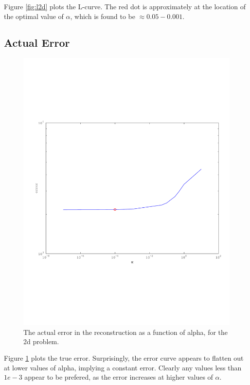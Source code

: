 \documentclass{article}
\begin{document}
Figure \ref{fig:l2d} plots the L-curve. The red dot is approximately at
the location of the optimal value of $\alpha$, which is found to be
$\approx 0.05 - 0.001$. 

\subsection{Actual Error}

\begin{figure}[!htb]
  \includegraphics[scale=.5]{plots/2d-true.pdf}
  \caption{The actual error in the reconstruction as a function of
 alpha, for the 2d problem.} 
  \label{fig:2dt}
\end{figure}

Figure \ref{fig:2dt} plots the true error. Surprisingly, the error curve
appears to flatten out at lower values of alpha, implying a constant
error. Clearly any values less than $1e-3$ appear to be prefered, as the
error increases at higher values of $\alpha$. 
\end{document}
